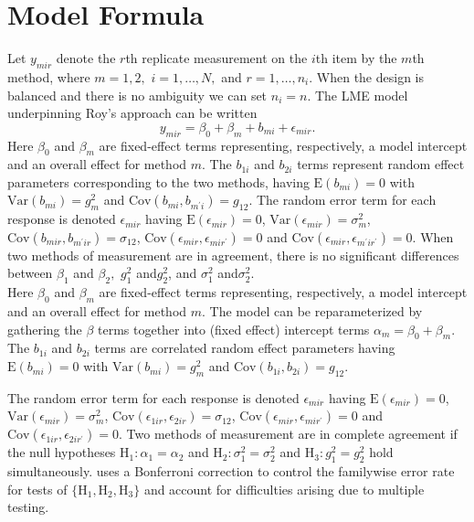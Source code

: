 \documentclass[12pt, a4paper]{report}
\theoremstyle{plain}
\theoremstyle{definition}
\theoremstyle{remark}
\begin{document}
\section{Model Formula}

Let $y_{mir} $ denote the $r$th replicate measurement on the $i$th item by the $m$th method, where $m=1,2,$ $i=1,\ldots,N,$ and $r = 1,\ldots,n_i.$ When the design is balanced and there is no ambiguity we can set $n_i=n.$ The LME model underpinning Roy's approach can be written
\begin{equation}\label{Roy-model}
y_{mir} = \beta_{0} + \beta_{m} + b_{mi} + \epsilon_{mir}.
\end{equation}
Here $\beta_0$ and $\beta_m$ are fixed-effect terms representing, respectively, a model intercept and an overall effect for method $m.$ The $b_{1i}$ and $b_{2i}$ terms represent random effect parameters corresponding to the two methods, having $\mathrm{E}(b_{mi})=0$ with $\mathrm{Var}(b_{mi})=g^2_m$ and $\mathrm{Cov}(b_{mi}, b_{m^\prime i})=g_{12}.$ The random error term for each response is denoted $\epsilon_{mir}$ having $\mathrm{E}(\epsilon_{mir})=0$, $\mathrm{Var}(\epsilon_{mir})=\sigma^2_m$, $\mathrm{Cov}(b_{mir}, b_{m^\prime ir})=\sigma_{12}$, $\mathrm{Cov}(\epsilon_{mir}, \epsilon_{mir^\prime})= 0$ and $\mathrm{Cov}(\epsilon_{mir}, \epsilon_{m^\prime ir^\prime})= 0.$
When two methods of measurement are in agreement, there is no significant differences between $\beta_1$ and $\beta_2,$ $g^2_1 $ and$ g^2_2$, and $\sigma^2_1 $ and$ \sigma^2_2$.\\
\bigskip
Here $\beta_0$ and $\beta_m$ are fixed-effect terms representing, respectively, a model intercept and an overall effect for method $m.$ The model can be reparameterized by gathering the $\beta$ terms together into (fixed effect) intercept terms $\alpha_m=\beta_0+\beta_m.$ The $b_{1i}$ and $b_{2i}$ terms are correlated random effect parameters having $\mathrm{E}(b_{mi})=0$ with $\mathrm{Var}(b_{mi})=g^2_m$ and $\mathrm{Cov}(b_{1i}, b_{2 i})=g_{12}.$ \\
\bigskip

The random error term for each response is denoted $\epsilon_{mir}$ having $\mathrm{E}(\epsilon_{mir})=0$, $\mathrm{Var}(\epsilon_{mir})=\sigma^2_m$, $\mathrm{Cov}(\epsilon_{1ir}, \epsilon_{2 ir})=\sigma_{12}$, $\mathrm{Cov}(\epsilon_{mir}, \epsilon_{mir^\prime})= 0$ and $\mathrm{Cov}(\epsilon_{1ir}, \epsilon_{2 ir^\prime})= 0.$ Two methods of measurement are in complete agreement if the null hypotheses $\mathrm{H}_1\colon \alpha_1 = \alpha_2$ and $\mathrm{H}_2\colon \sigma^2_1 = \sigma^2_2 $ and $\mathrm{H}_3\colon g^2_1= g^2_2$ hold simultaneously. \citet{roy} uses a Bonferroni correction to control the familywise error rate for tests of $\{\mathrm{H}_1, \mathrm{H}_2, \mathrm{H}_3\}$ and account for difficulties arising due to multiple testing. \\
\bigskip
\end{document}

